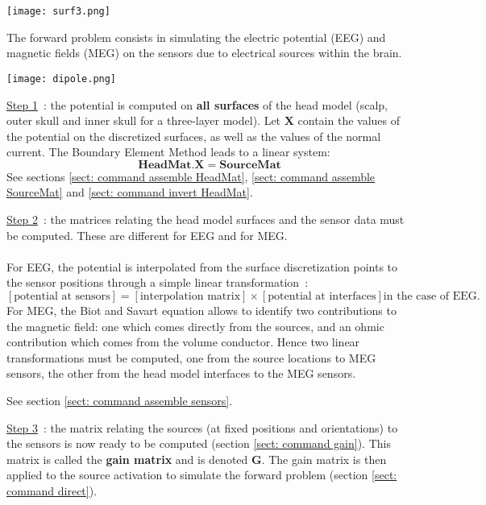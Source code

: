 \centerline{\texttt{[image: surf3.png]}}

\noindent
The forward problem consists in simulating the electric potential (EEG) and magnetic fields (MEG) on the sensors due to electrical sources within the brain.

\centerline{\texttt{[image: dipole.png]}}

\noindent
\underline{Step 1}~: the potential is computed on \textbf{all surfaces } of the head model (scalp, outer skull and inner skull for a three-layer model).  Let $\mathbf{X}$ contain the values of the potential on the discretized surfaces, as well as the values of the normal current. The Boundary Element Method leads to a linear system:
\[
    \mathbf{HeadMat} . \mathbf{X} = \mathbf{SourceMat}
\]
See sections \ref{sect: command assemble HeadMat}, \ref{sect: command assemble SourceMat} and \ref{sect: command invert HeadMat}.

\medskip

\noindent
\underline{Step 2}~: the matrices relating the head model surfaces and the sensor data must be computed. These are different for EEG and for MEG.\\
\\
For EEG, the potential is interpolated from the surface discretization points to the sensor positions through a simple linear transformation~:\\
\[
    \left[ \mbox{potential at sensors} \right] =
    \left[ \mbox{interpolation matrix} \right] \times \left[ \mbox{potential at interfaces} \right] \mbox{in the case of EEG.}
\]
For MEG, the Biot and Savart equation allows to identify two contributions to the magnetic field: one which comes directly from the sources, and an ohmic contribution which comes from the volume conductor. 
Hence two linear transformations must be computed, one from the source locations  to MEG sensors, the other from the head model interfaces to the MEG sensors.
  
See section \ref{sect: command assemble sensors}.

 
\medskip

\noindent
\underline{Step 3}~: the matrix relating the sources (at fixed positions and orientations) to the sensors is now ready to be computed (section \ref{sect: command gain}). This matrix is called  the \textbf{gain matrix} and is denoted  $\mathbf{G}$. The gain matrix is then applied to the source activation to simulate the forward problem  (section
\ref{sect: command direct}).
